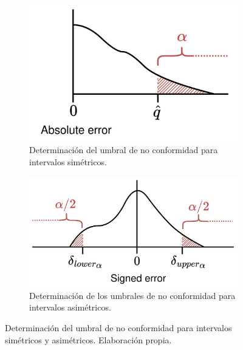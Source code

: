 \begin{enumerate}
\begin{figure}[h]
        \begin{subfigure}[b]{0.47\textwidth}
            \centering
            \includegraphics[width=\textwidth]{capitulos/cap_02/imagenes/nonconformity_quantile_threshold_simetric.png}
            \caption{Determinación del umbral de no conformidad para intervalos simétricos.}
            \label{fig:nonconformity_quantile_threshold_simetric}
        \end{subfigure}
        \hfill
        \begin{subfigure}[b]{0.49\textwidth}
            \centering
            \includegraphics[width=\textwidth]{capitulos/cap_02/imagenes/nonconformity_quantile_threshold_asimetric.png}
            \caption{Determinación de los umbrales de no conformidad para intervalos asimétricos.}
            \label{fig:nonconformity_quantile_threshold_asimetric}
        \end{subfigure}

        \caption[
            Determinación del umbral de no conformidad para intervalos simétricos y asimétricos.
        ]{
            Determinación del umbral de no conformidad para intervalos simétricos y asimétricos. 
            Elaboración propia.
        }
        \label{fig:nonconformity_quantile_comparation}
    \end{figure}

\end{enumerate}


